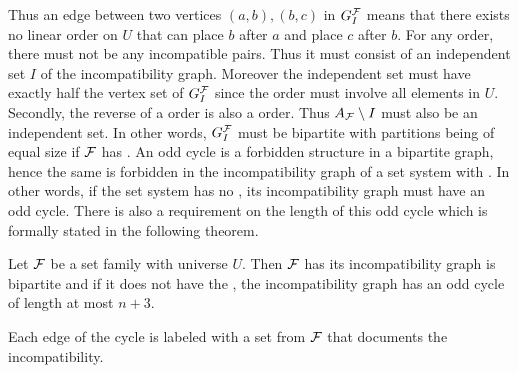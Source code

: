 Thus an edge between two vertices $(a,b), (b,c)$ in $G_I^{{\cal F}}$ means
that there exists no linear order on $U$ that can place $b$ after $a$
and place $c$ after $b$.  For any \COP order, there must not be any
incompatible pairs. Thus it must consist of an independent set $I$ of
the incompatibility graph. Moreover the independent set must have
exactly half the vertex set of $G_I^{\cal F}$ since the \COP order must
involve all elements in $U$. Secondly, the reverse of a \COP order is
also a \COP order. Thus $A_{\cal F} \setminus I$ must also be an
independent set. In other words, $G_I^{\cal F}$ must be bipartite with
partitions being of equal size if ${\cal F}$ has \COP. An odd cycle is a
forbidden structure in a bipartite graph, hence the same is forbidden
in the incompatibility graph of a set system with \COP. In other
words, if the set system has no \COP, its incompatibility graph must
have an odd cycle.  There is also a requirement on the length of this
odd cycle which is formally stated in the following
theorem. 

\begin{theoremsansproof} 
  Let ${\cal F}$ be a set family with universe $U$. Then ${\cal F}$ has \COP
  \iff its incompatibility graph is bipartite and if it does not have
  the \COP, the incompatibility graph has an odd cycle of length at
  most $n+3$.
\end{theoremsansproof}


Each edge of the cycle is labeled with a set from ${\cal F}$ that documents
the incompatibility.











